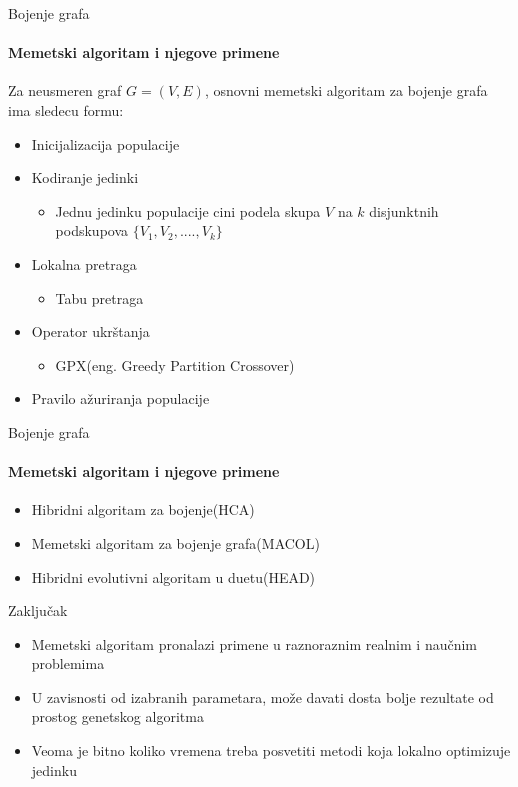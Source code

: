 \documentclass{beamer}
\begin{document}
\begin{frame}[fragile]{Bojenje grafa}
  \framesubtitle{Memetski algoritam i njegove primene}

Za neusmeren graf $G = (V, E)$, osnovni memetski algoritam za bojenje grafa ima sledecu formu:
   \begin{itemize}
    \item{Inicijalizacija populacije}
    \item{Kodiranje jedinki}
        \begin{itemize}
            \item Jednu jedinku populacije cini podela skupa $V$ na $k$  disjunktnih podskupova $\{V_1, V_2, ...., V_k\}$
        \end{itemize}
    \item{Lokalna pretraga}
        \begin{itemize}
            \item Tabu pretraga
        \end{itemize}
    \item{Operator ukrštanja}
        \begin{itemize}
            \item GPX(eng. Greedy Partition Crossover)
        \end{itemize}
    \item{Pravilo ažuriranja populacije}
  \end{itemize}



\end{frame}




\begin{frame}[fragile]{Bojenje grafa}
  \framesubtitle{Memetski algoritam i njegove primene}

   \begin{itemize}
    \item{Hibridni algoritam za bojenje(HCA)}
    \item{Memetski algoritam za bojenje grafa(MACOL)}
    \item{Hibridni evolutivni algoritam u duetu(HEAD)}
  \end{itemize}
  

\end{frame}

\begin{frame}[fragile]{Zaključak}
  
   \begin{itemize}
    \item{Memetski algoritam pronalazi primene u raznoraznim realnim i naučnim problemima}
    \item{U zavisnosti od izabranih parametara, može davati dosta bolje rezultate od prostog genetskog algoritma}
    \item{Veoma je bitno koliko vremena treba posvetiti metodi koja lokalno optimizuje jedinku}
    
    \end{itemize}
\end{frame}
\end{document}

